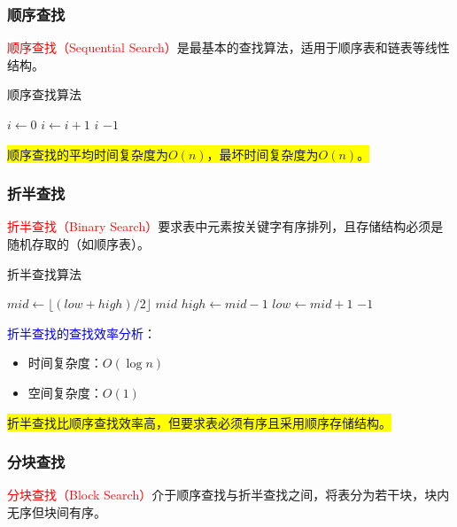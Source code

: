 \documentclass{../../note}
\begin{document}
\subsubsection{顺序查找}
\textcolor{red}{顺序查找（Sequential Search）}是最基本的查找算法，适用于顺序表和链表等线性结构。

\begin{algorithm}
  \caption{顺序查找算法}
  \begin{algorithmic}[1]
    \State $i \gets 0$
    \State $i \gets i + 1$
    \EndWhile
    \Return $i$ 
    \Else
    \Return $-1$ 
    \EndIf
    \EndProcedure
  \end{algorithmic}
\end{algorithm}

\colorbox{yellow}{顺序查找的平均时间复杂度为$O(n)$，最坏时间复杂度为$O(n)$。}

\subsubsection{折半查找}
\textcolor{red}{折半查找（Binary Search）}要求表中元素按关键字有序排列，且存储结构必须是随机存取的（如顺序表）。

\begin{algorithm}
  \caption{折半查找算法}
  \begin{algorithmic}[1]
    \State $mid \gets \lfloor (low + high) / 2 \rfloor$
    \Return $mid$ 
    \State $high \gets mid - 1$
    \Else
    \State $low \gets mid + 1$
    \EndIf
    \EndWhile
    \Return $-1$ 
    \EndProcedure
  \end{algorithmic}
\end{algorithm}

\textcolor{blue}{折半查找的查找效率分析}：
\begin{itemize}
  \item 时间复杂度：$O(\log n)$
  \item 空间复杂度：$O(1)$
\end{itemize}

\colorbox{yellow}{折半查找比顺序查找效率高，但要求表必须有序且采用顺序存储结构。}

\subsubsection{分块查找}
\textcolor{red}{分块查找（Block Search）}介于顺序查找与折半查找之间，将表分为若干块，块内无序但块间有序。
\end{document}
